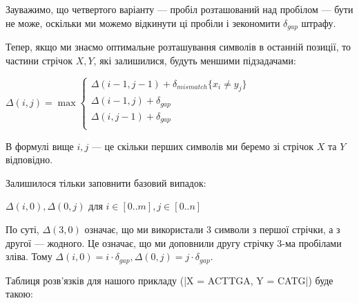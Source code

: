 \documentclass[12pt,a4paper]{report}
\begin{document}
Зауважимо, що четвертого варіанту --- пробіл розташований над пробілом --- бути не може, оскільки ми можемо відкинути ці пробіли і зекономити \(\delta_{gap}\) штрафу.

Тепер, якщо ми знаємо оптимальне розташування символів в останній позиції, то частини стрічок \(X, Y\), які залишилися, будуть меншими підзадачами:

\begin{center}
    \( \Delta(i, j) = \max
        \begin{cases}
            \Delta(i - 1, j - 1) + \delta_{mismatch} \{x_i \neq y_j \} \\
            \Delta(i - 1, j) + \delta_{gap} \\
            \Delta(i, j - 1) + \delta_{gap} \\
        \end{cases}
    \)
\end{center}

В формулі вище \(i, j\) --- це скільки перших символів ми беремо зі стрічок \(X\) та \(Y\) відповідно.

Залишилося тільки заповнити базовий випадок:

\begin{center}
    \(\Delta(i, 0), \Delta(0, j)\) для \(i \in [0..m], j \in [0..n]\)
\end{center}

По суті, \(\Delta(3, 0)\) означає, що ми використали 3 символи з першої стрічки, а з другої --- жодного. Це означає, що ми доповнили другу стрічку 3-ма пробілами зліва. Тому \(\Delta(i, 0) = i \cdot \delta_{gap}, \Delta(0, j) = j \cdot \delta_{gap}\).
 
Таблиця розв’язків для нашого прикладу (|X = ACTTGA, Y = CATG|) буде такою:
\end{document}
